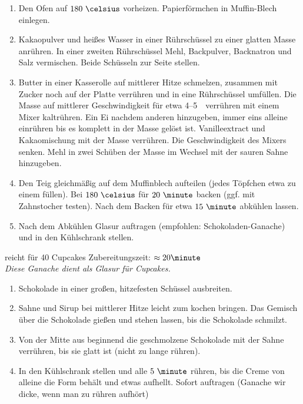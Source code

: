 \begin{enumerate}
 \item	Den Ofen auf $180~\celsius$ vorheizen. Papierförmchen in Muffin-Blech einlegen.
 \item	Kakaopulver und heißes Wasser in einer Rührschüssel zu einer glatten Masse anrühren.
	In einer zweiten Rührschüssel Mehl, Backpulver, Backnatron und Salz vermischen.
	Beide Schüsseln zur Seite stellen.
 \item	Butter in einer Kasserolle auf mittlerer Hitze schmelzen, zusammen mit Zucker noch auf der Platte verrühren und in eine
	Rührschüssel umfüllen.
	Die Masse auf mittlerer Geschwindigkeit für etwa 4--5~\minute\ verrühren mit einem Mixer kaltrühren.
	Ein Ei nachdem anderen hinzugeben, immer eins alleine einrühren bis es komplett in der Masse gelöst ist.
	Vanilleextract und Kakaomischung mit der Masse verrühren.
	Die Geschwindigkeit des Mixers senken.
	Mehl in zwei Schüben der Masse im Wechsel mit der sauren Sahne hinzugeben.
 \item	Den Teig gleichmäßig auf dem Muffinblech aufteilen (jedes Töpfchen etwa zu einem  füllen).
	Bei $180~\celsius$ für $20~\minute$ backen (ggf. mit Zahnstocher testen).
	Nach dem Backen für etwa $15~\minute$ abkühlen lassen.
 \item Nach dem Abkühlen Glasur auftragen (empfohlen: Schokoladen-Ganache) und in den Kühlschrank stellen.
\end{enumerate}
reicht für 40 Cupcakes \hfill Zubereitungszeit: $\approx20 \minute$
\hspace{0em}\\
\textit{Diese Ganache dient als Glasur für Cupcakes.}
\begin{enumerate}
 \item	Schokolade in einer großen, hitzefesten Schüssel ausbreiten.
 \item	Sahne und Sirup bei mittlerer Hitze leicht zum kochen bringen.
	Das Gemisch über die Schokolade gießen und stehen lassen, bis die Schokolade schmilzt.
 \item	Von der Mitte aus beginnend die geschmolzene Schokolade mit der Sahne verrühren, bis sie glatt ist (nicht zu lange rühren).
 \item	In den Kühlschrank stellen und alle $5~\minute$ rühren, bis die Creme von alleine die Form behält und etwas aufhellt.
	Sofort auftragen (Ganache wir dicke, wenn man zu rühren aufhört)
\end{enumerate}


